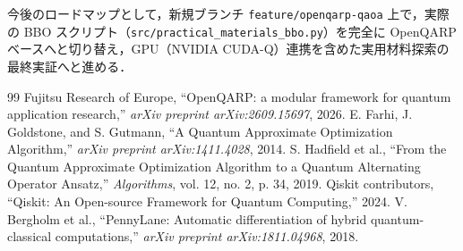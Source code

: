 \documentclass[11pt,a4paper]{ltjsarticle}
\begin{document}
今後のロードマップとして，新規ブランチ \texttt{feature/openqarp-qaoa} 上で，実際の BBO スクリプト（\texttt{src/practical\_materials\_bbo.py}）を完全に OpenQARP ベースへと切り替え，GPU（NVIDIA CUDA-Q）連携を含めた実用材料探索の最終実証へと進める．

\begin{thebibliography}{99}
Fujitsu Research of Europe, ``OpenQARP: a modular framework for quantum application research,'' \textit{arXiv preprint arXiv:2609.15697}, 2026.
E. Farhi, J. Goldstone, and S. Gutmann, ``A Quantum Approximate Optimization Algorithm,'' \textit{arXiv preprint arXiv:1411.4028}, 2014.
S. Hadfield et al., ``From the Quantum Approximate Optimization Algorithm to a Quantum Alternating Operator Ansatz,'' \textit{Algorithms}, vol. 12, no. 2, p. 34, 2019.
Qiskit contributors, ``Qiskit: An Open-source Framework for Quantum Computing,'' 2024.
V. Bergholm et al., ``PennyLane: Automatic differentiation of hybrid quantum-classical computations,'' \textit{arXiv preprint arXiv:1811.04968}, 2018.
\end{thebibliography}
\end{document}
